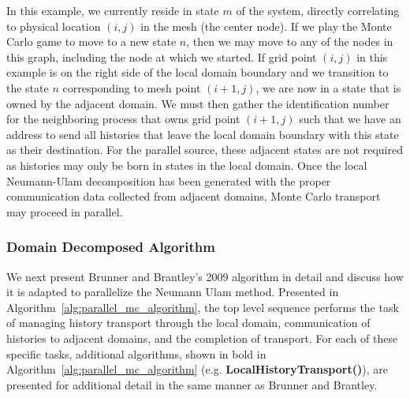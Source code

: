 \documentclass[letterpaper,11pt]{article}
\begin{document}
In this example, we currently reside in state $m$ of the system,
directly correlating to physical location $(i,j)$ in the mesh (the
center node). If we play the Monte Carlo game to move to a new state
$n$, then we may move to any of the nodes in this graph, including the
node at which we started. If grid point $(i,j)$ in this example is on
the right side of the local domain boundary and we transition to the
state $n$ corresponding to mesh point $(i+1,j)$, we are now in a state
that is owned by the adjacent domain. We must then gather the
identification number for the neighboring process that owns grid point
$(i+1,j)$ such that we have an address to send all histories that
leave the local domain boundary with this state as their
destination. For the parallel source, these adjacent states are not
required as histories may only be born in states in the local
domain. Once the local Neumann-Ulam decomposition has been generated
with the proper communication data collected from adjacent domains,
Monte Carlo transport may proceed in parallel.

\subsubsection{Domain Decomposed Algorithm}
\label{subsubsec:parallel_mc_algorithm}

We next present Brunner and Brantley's 2009 algorithm in detail and
discuss how it is adapted to parallelize the Neumann Ulam
method. Presented in Algorithm~\ref{alg:parallel_mc_algorithm}, the
top level sequence performs the task of managing history transport
through the local domain, communication of histories to adjacent
domains, and the completion of transport. For each of these specific
tasks, additional algorithms, shown in bold in
Algorithm~\ref{alg:parallel_mc_algorithm}
(e.g. \textbf{LocalHistoryTransport()}), are presented for additional
detail in the same manner as Brunner and Brantley.
\end{document}
